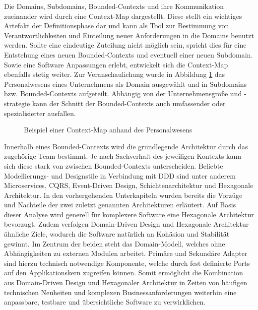 Die  Domains, Subdomains, Bounded-Contexts und ihre Kommunikation zueinander wird durch eine Context-Map dargestellt. Diese stellt ein wichtiges Artefakt der Definitionsphase dar und kann als Tool zur Bestimmung von Verantwortlichkeiten und Einteilung neuer Anforderungen in die Domains benutzt werden. Sollte eine eindeutige Zuteilung nicht möglich sein, spricht dies für eine Entstehung eines neuen Bounded-Contexts und eventuell einer neuen Subdomain. Sowie eine Software Anpassungen erlebt, entwickelt sich die Context-Map ebenfalls stetig weiter. Zur Veranschaulichung wurde in Abbildung \ref{fig:Context-Map-Example} das Personalwesens eines Unternehmens als Domain ausgewählt und in Subdomains bzw. Bounded-Contexts aufgeteilt. Abhängig von der Unternehmensgröße und -strategie kann der Schnitt der Bounded-Contexts auch umfassender oder spezialisierter ausfallen.


\begin{figure}
	\centering
	
	\caption{Beispiel einer Context-Map anhand des Personalwesens}
	\label{fig:Context-Map-Example}
\end{figure}

Innerhalb eines Bounded-Contexts wird die grundlegende Architektur durch das zugehörige Team bestimmt. Je nach Sachverhalt des jeweiligen Kontexts kann sich diese stark von zwischen Bounded-Contexts unterscheiden. Beliebte Modellierungs- und Designstile in Verbindung mit DDD sind unter anderem Microservices, CQRS, Event-Driven Design, Schichtenarchitektur und Hexagonale Architektur. In den vorhergehenden Unterkapiteln wurden bereits die Vorzüge und Nachteile der zwei zuletzt genannten Architekturen erläutert. Auf Basis dieser Analyse wird generell für komplexere Software eine Hexagonale Architektur bevorzugt. Zudem verfolgen Domain-Driven Design und Hexagonale Architektur ähnliche Ziele, wodurch die Software natürlich an Kohäsion und Stabilität gewinnt. Im Zentrum der beiden steht das Domain-Modell, welches ohne Abhängigkeiten zu externen Modulen arbeitet. Primäre und Sekundäre Adapter sind hierzu technisch notwendige Komponente, welche durch fest definierte Ports auf den Applikationskern zugreifen können. Somit ermöglicht die Kombination aus Domain-Driven Design und Hexagonaler Architektur in Zeiten von häufigen technischen Neuheiten und komplexen Businessanforderungen weiterhin eine anpassbare, testbare und übersichtliche Software zu verwirklichen.

